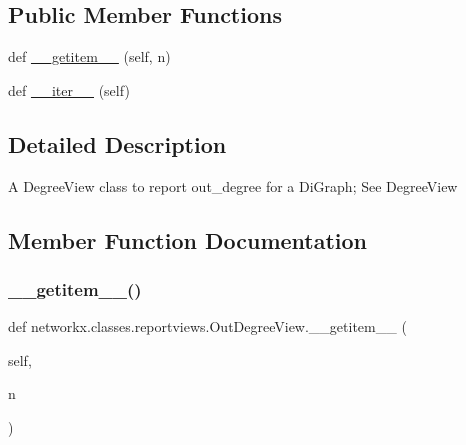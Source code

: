 \subsection*{Public Member Functions}
\begin{DoxyCompactItemize}
\item 
def \hyperlink{classnetworkx_1_1classes_1_1reportviews_1_1OutDegreeView_ace878b24841a1d77bc2bff9b06462739}{\+\_\+\+\_\+getitem\+\_\+\+\_\+} (self, n)
\item 
def \hyperlink{classnetworkx_1_1classes_1_1reportviews_1_1OutDegreeView_a71dfdba607c83f5504b5c07091ed1718}{\+\_\+\+\_\+iter\+\_\+\+\_\+} (self)
\end{DoxyCompactItemize}


\subsection{Detailed Description}
\begin{DoxyVerb}A DegreeView class to report out_degree for a DiGraph; See DegreeView\end{DoxyVerb}
 

\subsection{Member Function Documentation}
\mbox{\label{classnetworkx_1_1classes_1_1reportviews_1_1OutDegreeView_ace878b24841a1d77bc2bff9b06462739}} 
\subsubsection{\texorpdfstring{\+\_\+\+\_\+getitem\+\_\+\+\_\+()}{\_\_getitem\_\_()}}
{\footnotesize\ttfamily def networkx.\+classes.\+reportviews.\+Out\+Degree\+View.\+\_\+\+\_\+getitem\+\_\+\+\_\+ (\begin{DoxyParamCaption}\item[{}]{self,  }\item[{}]{n }\end{DoxyParamCaption})}

